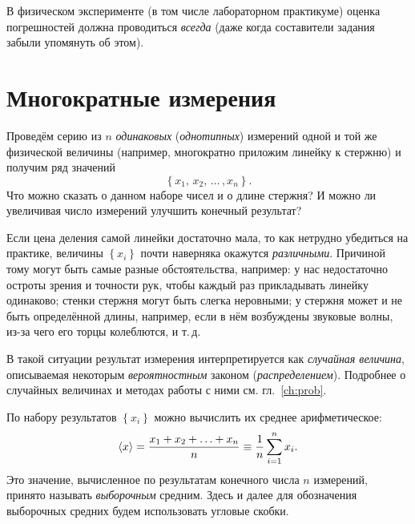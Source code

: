 В физическом эксперименте (в том числе лабораторном практикуме) оценка
погрешностей должна проводиться \emph{всегда}
(даже когда составители задания забыли упомянуть об этом).

\section{Многократные измерения}

Проведём серию из $n$ \emph{одинаковых} (\emph{однотипных}) измерений одной
и той же физической величины (например, многократно приложим линейку к стержню) и получим
ряд значений
\[
\left\{ x_{1},\,x_{2},\,\ldots\,,x_{n}\right\} .
\]
Что можно сказать о данном наборе чисел и о длине стержня?
И можно ли увеличивая число измерений улучшить конечный результат?

Если цена деления самой линейки достаточно мала, то как нетрудно убедиться
на практике, величины $\left\{ x_{i}\right\}$ почти наверняка окажутся
\emph{различными}. Причиной тому могут быть
самые разные обстоятельства, например: у нас недостаточно остроты
зрения и точности рук, чтобы каждый раз прикладывать линейку одинаково;
стенки стержня могут быть слегка неровными; у стержня может и не быть
определённой длины, например, если в нём возбуждены звуковые волны,
из-за чего его торцы колеблются, и т.\,д.

В такой ситуации результат измерения интерпретируется как
\emph{случайная величина}, описываемая некоторым \emph{вероятностным} законом
(\emph{распределением}).
Подробнее о случайных величинах и методах работы с ними см. гл.~\ref{ch:prob}.


По набору результатов $\left\{x_i\right\}$ можно вычислить их среднее арифметическое:
\begin{equation}
 \left<x\right>=\frac{x_{1}+x_{2}+\ldots+x_{n}}{n}\equiv\frac{1}{n}\sum\limits
_{i=1}^{n}x_{i}\label{eq:average}.
\end{equation}
Это значение, вычисленное по результатам конечного числа $n$ измерений,
принято называть \emph{выборочным} средним. Здесь и далее для обозначения
выборочных средних будем использовать угловые скобки.

